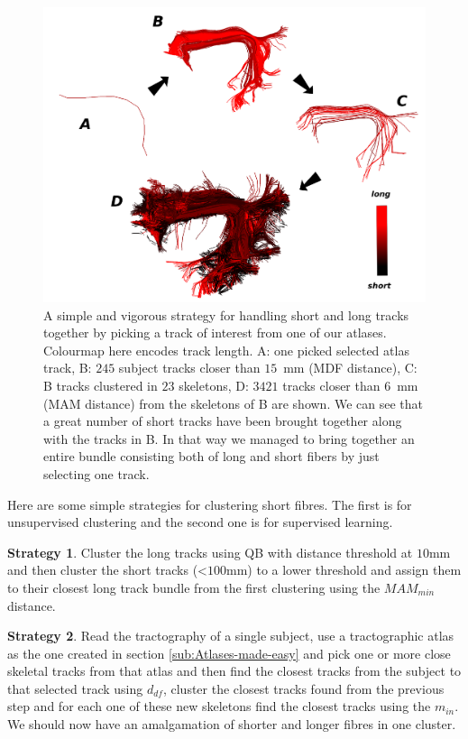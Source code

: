 \documentclass[preprint,authoryear,a4paper,10pt,onecolumn]{elsarticle}
\begin{document}
%
\begin{figure}
\begin{centering}
\includegraphics[scale=0.7]{last_figures/arcuate_small_fibers}
\par\end{centering}
\caption{A simple and vigorous strategy for handling short and long
  tracks together by picking a track of interest from one of our
  atlases. Colourmap here encodes track length. A: one picked selected
  atlas track, B: $245$ subject tracks closer than $15$~mm (MDF
  distance), C: B tracks clustered in $23$ skeletons, D: $3421$ tracks
  closer than $6$~mm (MAM distance) from the skeletons of B are shown. We
  can see that a great number of short tracks have been brought together
  along with the tracks in B. In that way we managed to bring together
  an entire bundle consisting both of long and short fibers by just
  selecting one track.\label{Flo:arcuate_close}}
\end{figure}


Here are some simple strategies for clustering short fibres. The first
is for unsupervised clustering and the second one is for supervised
learning.

\textbf{Strategy 1}. Cluster the long tracks using QB with distance
threshold at $10$mm and then cluster the short tracks (<$100$mm) to a
lower threshold and assign them to their closest long track bundle from
the first clustering using the $MAM_{min}$ distance.

\textbf{Strategy 2}. Read the tractography of a single subject, use a
tractographic atlas as the one created in section
\ref{sub:Atlases-made-easy} and pick one or more close skeletal tracks
from that atlas and then find the closest tracks from the subject to
that selected track using $d_{df}$, cluster the closest tracks found
from the previous step and for each one of these new skeletons find the
closest tracks using the $m_{in}$. We should now have an amalgamation of
shorter and longer fibres in one cluster.
\end{document}
